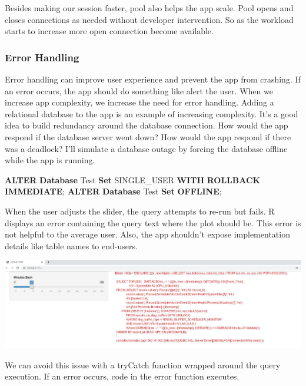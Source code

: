 \documentclass[]{article}
\newenvironment{Shaded}{\begin{snugshade}}{\end{snugshade}}
\newcommand{\KeywordTok}[1]{\textcolor[rgb]{0.13,0.29,0.53}{\textbf{#1}}}
\newcommand{\NormalTok}[1]{#1}
\begin{document}
Besides making our session faster, pool also helps the app scale. Pool
opens and closes connections as needed without developer intervention.
So as the workload starts to increase more open connection become
available.

\hypertarget{error-handling}{%
\subsubsection{Error Handling}\label{error-handling}}

Error handling can improve user experience and prevent the app from
crashing. If an error occurs, the app should do something like alert the
user. When we increase app complexity, we increase the need for error
handling. Adding a relational database to the app is an example of
increasing complexity. It's a good idea to build redundancy around the
database connection. How would the app respond if the database server
went down? How would the app respond if there was a deadlock? I'll
simulate a database outage by forcing the database offline while the app
is running.

\begin{Shaded}
\begin{Highlighting}[]
\KeywordTok{ALTER} \KeywordTok{Database}\NormalTok{ Test }\KeywordTok{Set}\NormalTok{ SINGLE_USER }\KeywordTok{WITH} \KeywordTok{ROLLBACK} \KeywordTok{IMMEDIATE}\NormalTok{;}
\KeywordTok{ALTER} \KeywordTok{Database}\NormalTok{ Test }\KeywordTok{Set} \KeywordTok{OFFLINE}\NormalTok{;}
\end{Highlighting}
\end{Shaded}

When the user adjusts the slider, the query attempts to re-run but
fails. R displays an error containing the query text where the plot
should be. This error is not helpful to the average user. Also, the app
shouldn't expose implementation details like table names to end-users.

\includegraphics{./Images/ErrorMessage.JPG}

We can avoid this issue with a tryCatch function wrapped around the
query execution. If an error occurs, code in the error function
executes.
\end{document}
